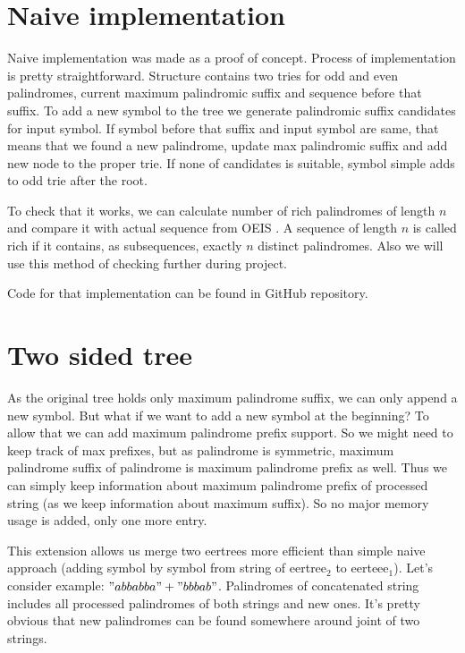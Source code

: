 \section{Naive implementation}
Naive implementation was made as a proof of concept. Process of implementation is pretty straightforward. Structure contains two tries for odd and even palindromes, current maximum palindromic suffix and sequence before that suffix. To add a new symbol to the tree we generate palindromic suffix candidates for input symbol. If symbol before that suffix and input symbol are same, that means that we found a new palindrome, update max palindromic suffix and add new node to the proper trie. If none of candidates is suitable, symbol simple adds to odd trie after the root. 

To check that it works, we can calculate number of rich palindromes of length $n$ and compare it with actual sequence from OEIS \cite{oeisA216264}. A sequence of length $n$ is called rich if it contains, as subsequences, exactly $n$ distinct palindromes. Also we will use this method of checking further during project.

Code for that implementation can be found in GitHub repository\cite{khazhix3}.
\section{Two sided tree}
As the original tree \cite{RUBINCHIK2018249} holds only maximum palindrome suffix, we can only append a new symbol. But what if we want to add a new symbol at the beginning? To allow that we can add maximum palindrome prefix support. So we might need to keep track of max prefixes, but as palindrome is symmetric, maximum palindrome suffix of palindrome is maximum palindrome prefix as well. Thus we can simply keep information about maximum palindrome prefix of processed string (as we keep information about maximum suffix). So no major memory usage is added, only one more entry.

This extension allows us merge two eertrees more efficient than simple naive approach (adding symbol by symbol from string of eertree$_2$ to eerteee$_1$). Let's consider example: $"abbabba" + "bbbab"$.
Palindromes of concatenated string includes all processed palindromes of both strings and new ones. It's pretty obvious that new palindromes can be found somewhere around joint of two strings. 

